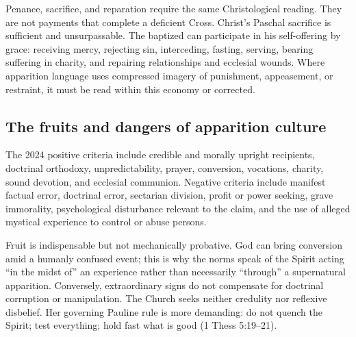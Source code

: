 Penance, sacrifice, and reparation require the same Christological reading. They are not payments that complete a deficient Cross. Christ's Paschal sacrifice is sufficient and unsurpassable. The baptized can participate in his self-offering by grace: receiving mercy, rejecting sin, interceding, fasting, serving, bearing suffering in charity, and repairing relationships and ecclesial wounds. Where apparition language uses compressed imagery of punishment, appeasement, or restraint, it must be read within this economy or corrected.

\subsection{The fruits and dangers of apparition culture}

The 2024 positive criteria include credible and morally upright recipients, doctrinal orthodoxy, unpredictability, prayer, conversion, vocations, charity, sound devotion, and ecclesial communion. Negative criteria include manifest factual error, doctrinal error, sectarian division, profit or power seeking, grave immorality, psychological disturbance relevant to the claim, and the use of alleged mystical experience to control or abuse persons.

Fruit is indispensable but not mechanically probative. God can bring conversion amid a humanly confused event; this is why the norms speak of the Spirit acting ``in the midst of'' an experience rather than necessarily ``through'' a supernatural apparition. Conversely, extraordinary signs do not compensate for doctrinal corruption or manipulation. The Church seeks neither credulity nor reflexive disbelief. Her governing Pauline rule is more demanding: do not quench the Spirit; test everything; hold fast what is good (1 Thess 5:19--21).
